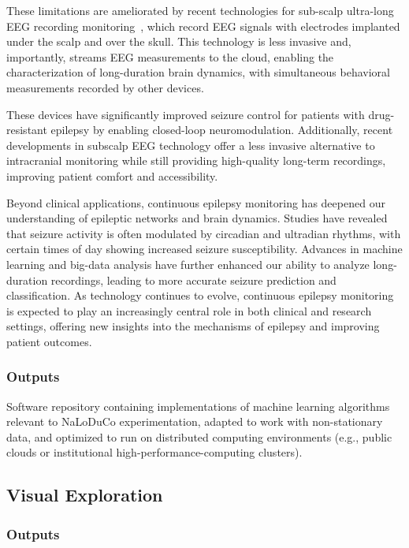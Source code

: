 \documentclass[12pt]{article}
\begin{document}
These limitations are ameliorated by recent technologies for sub-scalp
ultra-long EEG recording monitoring~\citep{duunHenriksenEtAl20}, which record
EEG signals with electrodes implanted under the scalp and over the skull. This
technology is less invasive and, importantly, streams EEG measurements to the
cloud, enabling the characterization of long-duration brain dynamics, with
simultaneous behavioral measurements recorded by other devices.

These devices have significantly improved seizure
control for patients with drug-resistant epilepsy by enabling closed-loop
neuromodulation. Additionally, recent developments in subscalp EEG technology
offer a less invasive alternative to intracranial monitoring while still
providing high-quality long-term recordings, improving patient comfort and
accessibility.

Beyond clinical applications, continuous epilepsy monitoring has deepened our
understanding of epileptic networks and brain dynamics. Studies have revealed
that seizure activity is often modulated by circadian and ultradian rhythms,
with certain times of day showing increased seizure susceptibility. Advances in
machine learning and big-data analysis have further enhanced our ability to
analyze long-duration recordings, leading to more accurate seizure prediction
and classification. As technology continues to evolve, continuous epilepsy
monitoring is expected to play an increasingly central role in both clinical
and research settings, offering new insights into the mechanisms of epilepsy
and improving patient outcomes.

\subsubsection{Outputs}
\label{sec:outputOfflineAnalysis}

Software repository containing implementations of machine learning algorithms
relevant to NaLoDuCo experimentation, adapted to work with non-stationary data,
and optimized to run on distributed computing environments (e.g., public clouds
or institutional high-performance-computing clusters).

\subsection{Visual Exploration}
\label{sec:visualExploration}

\subsubsection{Outputs}
\end{document}
